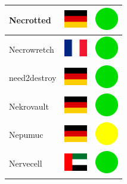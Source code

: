 \documentclass[12pt, a4paper, twoside]{report}
\begin{document}
\begin{center}
\begin{longtable}{|p{5cm}|p{2cm}|p{2cm}|}
 Necrotted                                                  & \includegraphics[width=1cm]{../img/flags/de} &   \includegraphics[width=1cm]{../likes/y} \\ \hline
 Necrowretch                                                & \includegraphics[width=1cm]{../img/flags/fr} &   \includegraphics[width=1cm]{../likes/y} \\ \hline
 need2destroy                                               & \includegraphics[width=1cm]{../img/flags/de} &   \includegraphics[width=1cm]{../likes/y} \\ \hline
 Nekrovault                                                 & \includegraphics[width=1cm]{../img/flags/de} &   \includegraphics[width=1cm]{../likes/y} \\ \hline
 Nepumuc                                                    & \includegraphics[width=1cm]{../img/flags/de} &   \includegraphics[width=1cm]{../likes/m} \\ \hline
 Nervecell                                                  & \includegraphics[width=1cm]{../img/flags/ae} &   \includegraphics[width=1cm]{../likes/y} \\ \hline

\end{longtable}
\end{center}
\end{document}
